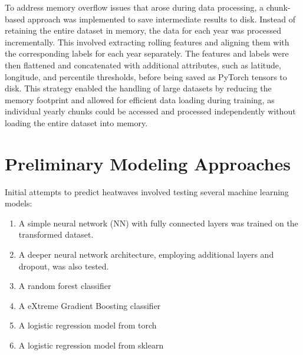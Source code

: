 \documentclass[8pt,a4paper]{article}
\begin{document}
To address memory overflow issues that arose during data processing, a chunk-based approach was implemented to save intermediate results to disk. Instead of retaining the entire dataset in memory, the data for each year was processed incrementally. This involved extracting rolling features and aligning them with the corresponding labels for each year separately. The features and labels were then flattened and concatenated with additional attributes, such as latitude, longitude, and percentile thresholds, before being saved as PyTorch tensors to disk. This strategy enabled the handling of large datasets by reducing the memory footprint and allowed for efficient data loading during training, as individual yearly chunks could be accessed and processed independently without loading the entire dataset into memory.

\section{Preliminary Modeling Approaches}
Initial attempts to predict heatwaves involved testing several machine learning models:
\begin{enumerate}[1.]
    \item A simple neural network (NN) with fully connected layers was trained on the transformed dataset.
    \item A deeper neural network architecture, employing additional layers and dropout, was also tested.
    \item A random forest classifier
    \item A eXtreme Gradient Boosting classifier
    \item A logistic regression model from torch
    \item A logistic regression model from sklearn
\end{enumerate}
\end{document}
